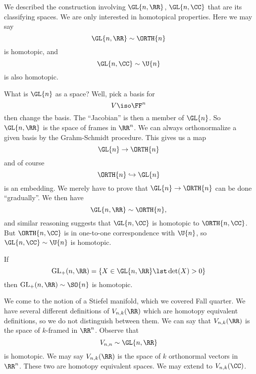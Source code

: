 We described the construction involving $\GL{n,\RR}$,
$\GL{n,\CC}$ that are its classifying spaces. We are only
interested in homotopical properties. Here we may say 
\begin{equation}
\GL{n,\RR}\homotopic\ORTH{n}
\end{equation}
is homotopic, and
\begin{equation}
\GL{n,\CC}\homotopic\U{n}
\end{equation}
is also homotopic.

What is $\GL{n}$ as a space? Well, pick a basis for 
\begin{equation}
V\iso\FF^{n}
\end{equation}
then change the basis. The ``Jacobian'' is then a member of
$\GL{n}$. So $\GL{n,\RR}$ is the space of frames in $\RR^{n}$. We
can always orthonormalize a given basis by the Grahm-Schmidt
procedure. This gives us a map
\begin{equation}
\GL{n}\to\ORTH{n}
\end{equation}
and of course
\begin{equation}
\ORTH{n}\Into\GL{n}
\end{equation}
is an embedding. We merely have to prove that $\GL{n}\to\ORTH{n}$
can be done ``gradually''. We then have
\begin{equation}
\GL{n,\RR}\homotopic\ORTH{n},
\end{equation}
and similar reasoning suggests that $\GL{n,\CC}$ is homotopic to
$\ORTH{n,\CC}$. But $\ORTH{n,\CC}$ is in one-to-one
correspondence with $\U{n}$, so $\GL{n,\CC}\homotopic\U{n}$ is
homotopic.

If 
\begin{equation}
\mathrm{GL}_{+}(n,\RR)=\{X\in\GL{n,\RR}\lst\det(X)>0\}
\end{equation}
then $\mathrm{GL}_{+}(n,\RR)\homotopic\SO{n}$ is homotopic.

We come to the notion of a Stiefel manifold, which we covered
Fall quarter. We have several different definitions of
$V_{n,k}(\RR)$ which are homotopy equivalent definitions, so we
do not distinguish between them. We can say that $V_{n,k}(\RR)$
is the space of $k$-framed in $\RR^{n}$. Observe that
\begin{equation}
V_{n,n}\homotopic\GL{n,\RR}
\end{equation}
is homotopic. We may say $V_{n,k}(\RR)$ is the space of $k$
orthonormal vectors in $\RR^{n}$. These two are homotopy
equivalent spaces. We may extend to $V_{n,k}(\CC)$.

